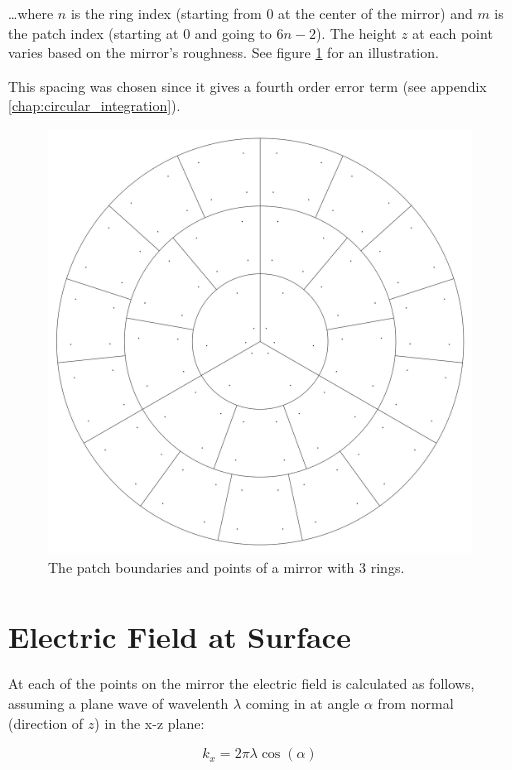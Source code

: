 \documentclass[etd,twoside,senior,noacknowledgments]{BYUPhys}
\begin{document}
\ldots where $n$ is the ring index (starting from 0 at the center of the mirror) and $m$ is the patch index (starting at 0 and going to $6n-2$). The height $z$ at each point varies based on the mirror's roughness. See figure \ref{fig:patches_points} for an illustration.

This spacing was chosen since it gives a fourth order error term (see appendix \ref{chap:circular_integration}).

\begin{figure}
  \centerline{\includegraphics[width=\textwidth]{circular-grid-with-points}}
  \caption[Mirror patch boundaries and point locations]{\label{fig:patches_points}
    The patch boundaries and points of a mirror with 3 rings.}
\end{figure}



\section{Electric Field at Surface}\label{chap:efield}

At each of the points on the mirror the electric field is calculated as follows, assuming a plane wave of wavelenth $\lambda$ coming in at angle $\alpha$ from normal (direction of $z$) in the x-z plane:

\begin{equation}
  k_{x}=2\pi\lambda\cos\left(\alpha\right)
\end{equation}
\end{document}
